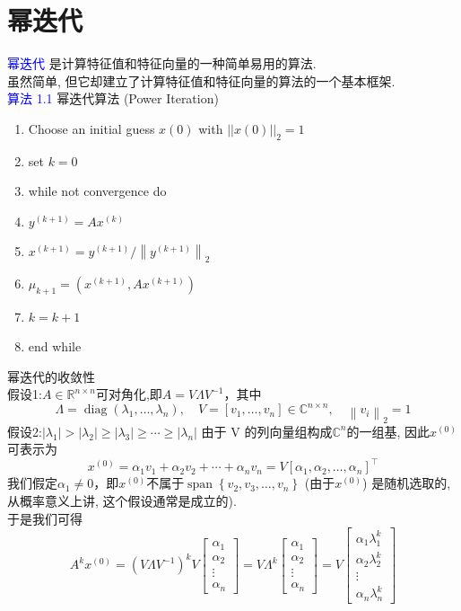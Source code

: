 \documentclass[12pt,a4paper]{article}
\begin{document}
\section{幂迭代}
\textcolor{blue}{幂迭代} 是计算特征值和特征向量的一种简单易用的算法.\\
虽然简单, 但它却建立了计算特征值和特征向量的算法的一个基本框架.\\
\textcolor{blue}{算法 1.1} 幂迭代算法 (Power Iteration)
\begin{enumerate}[1:]
\item Choose an initial guess $x(0)$ with $||x(0)||_{2} = 1$
\item set $k=0$
\item while not convergence do
\item \qquad$y^{(k+1)} = Ax^{(k)}$
\item \qquad$x^{(k+1)}=y^{(k+1)} /\left\|y^{(k+1)}\right\|_{2}$
\item \qquad$\mu_{k+1}=\left(x^{(k+1)}, A x^{(k+1)}\right)$
\item \qquad$k=k+1$
\item end while
\end{enumerate}
 幂迭代的收敛性\\
 假设1:$A \in \mathbb{R}^{n \times n}$可对角化,即$A=V \Lambda V^{-1}$，其中
$$
\Lambda=\operatorname{diag}\left(\lambda_{1}, \ldots, \lambda_{n}\right), \quad V=\left[v_{1}, \ldots, v_{n}\right] \in \mathbb{C}^{n \times n}, \quad\left\|v_{i}\right\|_{2}=1
$$
假设2:$\left|\lambda_{1}\right|>\left|\lambda_{2}\right| \geq\left|\lambda_{3}\right| \geq \cdots \geq\left|\lambda_{n}\right|$
由于 V 的列向量组构成$\mathbb{C}^{n}$的一组基, 因此$x^{(0)}$可表示为
$$
x^{(0)}=\alpha_{1} v_{1}+\alpha_{2} v_{2}+\cdots+\alpha_{n} v_{n}=V\left[\alpha_{1}, \alpha_{2}, \ldots, \alpha_{n}\right]^{\top}
$$
我们假定$\alpha_{1} \neq 0$，即$x^{(0)}$不属于$\operatorname{span}\left\{v_{2}, v_{3}, \ldots, v_{n}\right\}$
(由于$x^{(0)}$) 是随机选取的, 从概率意义上讲, 这个假设通常是成立的).\\
于是我们可得
$$
A^{k} x^{(0)}=\left(V \Lambda V^{-1}\right)^{k} V\left[\begin{array}{c}{\alpha_{1}} \\ {\alpha_{2}} \\ {\vdots} \\ {\alpha_{n}}\end{array}\right]=V \Lambda^{k}\left[\begin{array}{c}{\alpha_{1}} \\ {\alpha_{2}} \\ {\vdots} \\ {\alpha_{n}}\end{array}\right]=V\left[\begin{array}{c}{\alpha_{1} \lambda_{1}^{k}} \\ {\alpha_{2} \lambda_{2}^{k}} \\ {\vdots} \\ {\alpha_{n} \lambda_{n}^{k}}\end{array}\right]
$$
\end{document}
